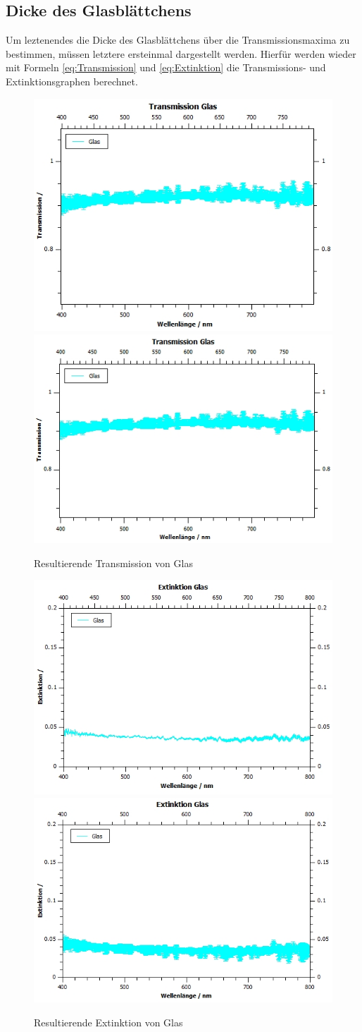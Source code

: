 \documentclass[12pt,a4paper,twoside]{article}
\begin{document}
\subsection{Dicke des Glasblättchens}

Um leztenendes die Dicke des Glasblättchens über die Transmissionsmaxima zu bestimmen, müssen letztere ersteinmal dargestellt werden.
Hierfür werden wieder mit Formeln \ref{eq:Transmission} und \ref{eq:Extinktion} die Transmissions- und Extinktionsgraphen berechnet.

\begin{figure}[H]
    \centering
    \includegraphics[width=0.4\linewidth]{nudes/qti-Transmission-GlasOU.jpg}
    \includegraphics[width=0.4\linewidth]{nudes/qti-Transmission-Glas.jpg}
    \caption{Resultierende Transmission von Glas}
    \label{fig:TransmissionGlas}
\end{figure}

\begin{figure}[H]
    \centering
    \includegraphics[width=0.4\linewidth]{nudes/qti-Extinktion-GlasOU.jpg}
    \includegraphics[width=0.4\linewidth]{nudes/qti-Extinktion-Glas.jpg}
    \caption{Resultierende Extinktion von Glas}
    \label{fig:ExtinktionGlas}
\end{figure}
\end{document}
